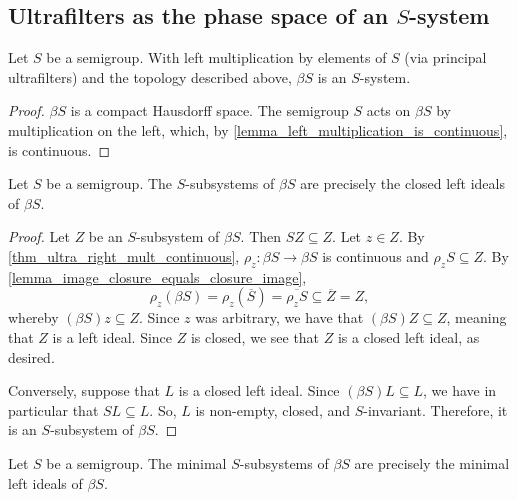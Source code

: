 \subsection{Ultrafilters as the phase space of an $S$-system}

\begin{theorem}
    \label{thm_ultrafilters_as_system}
    \leanok{}
    Let $S$ be a semigroup.  With left multiplication by elements of $S$ (via principal ultrafilters) and the topology described above, $\beta S$ is an $S$-system.
\end{theorem}

\begin{proof}
\leanok{}
    $\beta S$ is a compact Hausdorff space.  The semigroup $S$ acts on $\beta S$ by multiplication on the left, which, by \cref{lemma_left_multiplication_is_continuous}, is continuous.
\end{proof}

\begin{theorem}
\label{thm_beta_S_subsystem_characterization}
\leanok{}
    Let $S$ be a semigroup.  The $S$-subsystems of $\beta S$ are precisely the closed left ideals of $\beta S$.
\end{theorem}

\begin{proof}
\leanok{}
    Let $Z$ be an $S$-subsystem of $\beta S$.  Then $SZ \subseteq Z$.  Let $z \in Z$.  By \cref{thm_ultra_right_mult_continuous}, $\rho_z: \beta S \to \beta S$ is continuous and $\rho_z S \subseteq Z$.  By \cref{lemma_image_closure_equals_closure_image},
    \[\rho_z(\beta S) = \rho_z(\overline{S}) = \overline{\rho_z S} \subseteq \overline{Z} = Z,\]
    whereby $(\beta S)z \subseteq Z$.  Since $z$ was arbitrary, we have that $(\beta S)Z \subseteq Z$, meaning that $Z$ is a left ideal.  Since $Z$ is closed, we see that $Z$ is a closed left ideal, as desired.

    Conversely, suppose that $L$ is a closed left ideal.  Since $(\beta S)L \subseteq L$, we have in particular that $SL \subseteq L$.  So, $L$ is non-empty, closed, and $S$-invariant.  Therefore, it is an $S$-subsystem of $\beta S$.
\end{proof}

\begin{theorem}
\label{thm_minimal_beta_S_subsystem_characterization}
\leanok{}
    Let $S$ be a semigroup.  The minimal $S$-subsystems of $\beta S$ are precisely the minimal left ideals of $\beta S$.
\end{theorem}

